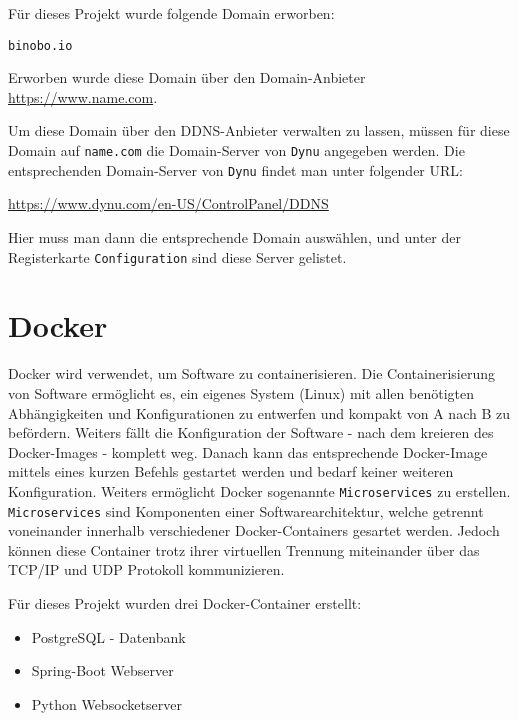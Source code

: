 \documentclass[paper=a4,12pt]{scrreprt}
\begin{document}
Für dieses Projekt wurde folgende Domain erworben:\newline

\texttt{binobo.io}\newline

Erworben wurde diese Domain über den Domain-Anbieter \url{https://www.name.com}.\newline

Um diese Domain über den DDNS-Anbieter verwalten zu lassen, müssen für diese Domain auf \texttt{name.com} die Domain-Server von \texttt{Dynu} angegeben werden. Die entsprechenden Domain-Server von \texttt{Dynu} findet man unter folgender URL:\newline

\url{https://www.dynu.com/en-US/ControlPanel/DDNS}\newline

Hier muss man dann die entsprechende Domain auswählen, und unter der Registerkarte \texttt{Configuration} sind diese Server gelistet.\newline


\section{Docker}
\label{sec:docker}

Docker\cite{docker} wird verwendet, um Software zu containerisieren. Die Containerisierung von Software ermöglicht es, ein eigenes System (Linux) mit allen benötigten Abhängigkeiten und Konfigurationen zu entwerfen und kompakt von A nach B zu befördern. Weiters fällt die Konfiguration der Software - nach dem kreieren des Docker-Images - komplett weg. Danach kann das entsprechende Docker-Image mittels eines kurzen Befehls gestartet werden und bedarf keiner weiteren Konfiguration.\newline
Weiters ermöglicht Docker sogenannte \texttt{Microservices} zu erstellen. \texttt{Microservices} sind Komponenten einer Softwarearchitektur, welche getrennt voneinander innerhalb verschiedener Docker-Containers gesartet werden. Jedoch können diese Container trotz ihrer virtuellen Trennung miteinander über das TCP/IP und UDP Protokoll kommunizieren.\newline

Für dieses Projekt wurden drei Docker-Container erstellt:\newline
\begin{itemize}
  \item PostgreSQL - Datenbank
  \item Spring-Boot Webserver
  \item Python Websocketserver
\end{itemize}
\end{document}
